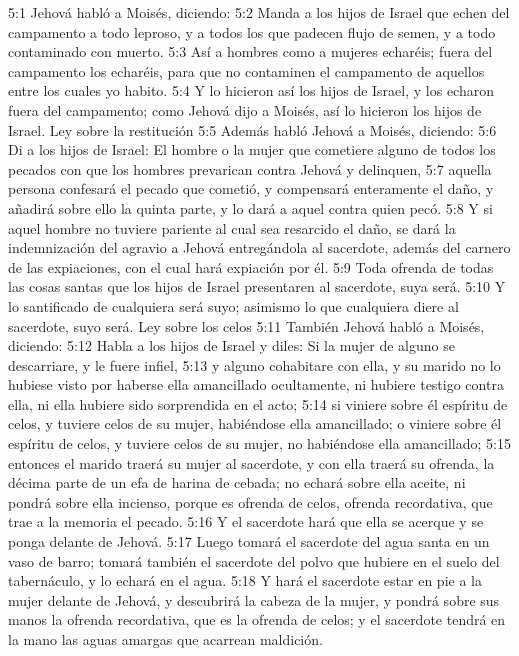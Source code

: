 5:1 Jehová habló a Moisés, diciendo:  
5:2 Manda a los hijos de Israel que echen del campamento a todo leproso, y a todos los que padecen flujo de semen, y a todo contaminado con muerto.  
5:3 Así a hombres como a mujeres echaréis; fuera del campamento los echaréis, para que no contaminen el campamento de aquellos entre los cuales yo habito.  
5:4 Y lo hicieron así los hijos de Israel, y los echaron fuera del campamento; como Jehová dijo a Moisés, así lo hicieron los hijos de Israel.  
Ley sobre la restitución  
5:5 Además habló Jehová a Moisés, diciendo:  
5:6 Di a los hijos de Israel: El hombre o la mujer que cometiere alguno de todos los pecados con que los hombres prevarican contra Jehová y delinquen,  
5:7 aquella persona confesará el pecado que cometió, y compensará enteramente el daño, y añadirá sobre ello la quinta parte, y lo dará a aquel contra quien pecó.  
5:8 Y si aquel hombre no tuviere pariente al cual sea resarcido el daño, se dará la indemnización del agravio a Jehová entregándola al sacerdote, además del carnero de las expiaciones, con el cual hará expiación por él. 
5:9 Toda ofrenda de todas las cosas santas que los hijos de Israel presentaren al sacerdote, suya será.  
5:10 Y lo santificado de cualquiera será suyo; asimismo lo que cualquiera diere al sacerdote, suyo será.  
Ley sobre los celos  
5:11 También Jehová habló a Moisés, diciendo:  
5:12 Habla a los hijos de Israel y diles: Si la mujer de alguno se descarriare, y le fuere infiel,  
5:13 y alguno cohabitare con ella, y su marido no lo hubiese visto por haberse ella amancillado ocultamente, ni hubiere testigo contra ella, ni ella hubiere sido sorprendida en el acto;  
5:14 si viniere sobre él espíritu de celos, y tuviere celos de su mujer, habiéndose ella amancillado; o viniere sobre él espíritu de celos, y tuviere celos de su mujer, no habiéndose ella amancillado;  
5:15 entonces el marido traerá su mujer al sacerdote, y con ella traerá su ofrenda, la décima parte de un efa   de harina de cebada; no echará sobre ella aceite, ni pondrá sobre ella incienso, porque es ofrenda de celos, ofrenda recordativa, que trae a la memoria el pecado. 
5:16 Y el sacerdote hará que ella se acerque y se ponga delante de Jehová.  
5:17 Luego tomará el sacerdote del agua santa en un vaso de barro; tomará también el sacerdote del polvo que hubiere en el suelo del tabernáculo, y lo echará en el agua.  
5:18 Y hará el sacerdote estar en pie a la mujer delante de Jehová, y descubrirá la cabeza de la mujer, y pondrá sobre sus manos la ofrenda recordativa, que es la ofrenda de celos; y el sacerdote tendrá en la mano las aguas amargas que acarrean maldición.  
